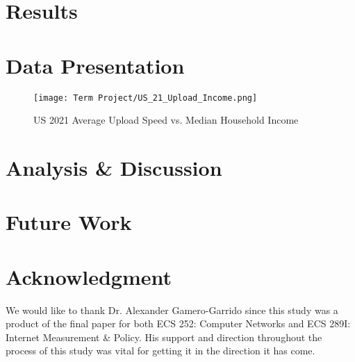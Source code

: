 \documentclass[conference]{IEEEtran}
\begin{document}
\section{Results}


\section{Data Presentation}

\begin{figure*}[!htbp]
    \centering
    \texttt{[image: Term Project/US\_21\_Upload\_Income.png]}
    \caption{US 2021 Average Upload Speed vs. Median Household Income}
    \label{fig:US_21_Upload_Income}
\end{figure*}



\section{Analysis \& Discussion}

\section{Future Work}

\section*{Acknowledgment}

We would like to thank Dr. Alexander Gamero-Garrido since this study was a product of the final paper for both ECS 252: Computer Networks and ECS 289I: Internet Measurement \& Policy. His support and direction throughout the process of this study was vital for getting it in the direction it has come.
\end{document}
